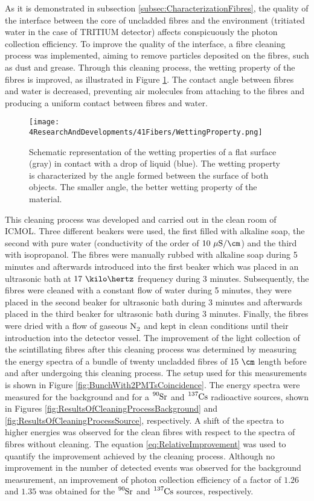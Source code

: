 As it is demonstrated in subsection \ref{subsec:CharacterizationFibres}, the quality of the interface between the core of uncladded fibres and the environment (tritiated water in the case of TRITIUM detector) affects conspicuously the photon collection efficiency. To improve the quality of the interface, a fibre cleaning process was implemented, aiming to remove particles deposited on the fibres, such as dust and grease.  Through this cleaning process, the wetting property of the fibres is improved, as illustrated in Figure \ref{fig:WettingProperty}. The contact angle between fibres and water is decreased, preventing air molecules from attaching to the fibres and producing a uniform contact between fibres and water.
\begin{figure}[h]
\centering
\texttt{[image: 4ResearchAndDevelopments/41Fibers/WettingProperty.png]}
\caption{Schematic representation of the wetting properties of a flat surface (gray) in contact with a drop of liquid (blue). The wetting property is characterized by the angle formed between the surface of both objects. The smaller angle, the better wetting property of the material. \cite{WettingProperty}\label{fig:WettingProperty}}
\end{figure}
This cleaning process  was developed and carried out in the clean room of ICMOL. Three different beakers were used, the first filled with alkaline soap, the second with pure water (conductivity of the order of $10~\mu\text{S}/\cm$) and the third with isopropanol. The fibres were manually rubbed with alkaline soap during 5 minutes and afterwards introduced into the first beaker which was placed in an ultrasonic bath at $17~\kilo\hertz$ frequency during 3 minutes. Subsequently, the fibres were cleaned with a constant flow of water during 5 minutes, they were placed in the second beaker for ultrasonic bath during 3 minutes and afterwards placed in the third beaker for ultrasonic bath during 3 minutes. Finally, the fibres were dried with a flow of gaseous $\ce{N_2}$ and kept in clean conditions until their introduction into the detector vessel. The improvement of the light collection of the scintillating fibres after this cleaning process was determined by measuring the energy spectra of a bundle of twenty uncladded fibres of $15~\cm$ length before and after undergoing this cleaning process. The setup used for this measurements is shown in Figure \ref{fig:BunchWith2PMTsCoincidence}. The energy spectra were measured for the background and for a $\ce{^{90}Sr}$ and $\ce{^{137}Cs}$ radioactive sources, shown in Figures \ref{fig:ResultsOfCleaningProcessBackground} and \ref{fig:ResultsOfCleaningProcessSource}, respectively. A shift of the spectra to higher energies was observed for the clean fibres with respect to the spectra of fibres without cleaning. The equation \ref{eq:RelativeImprovement} was used to quantify the improvement achieved by the cleaning process. Although no improvement in the number of detected events was observed for the background measurement, an improvement of photon collection efficiency of a factor of $1.26$ and $1.35$ was obtained for the $\ce{^{90}Sr}$ and $\ce{^{137}Cs}$ sources, respectively.

